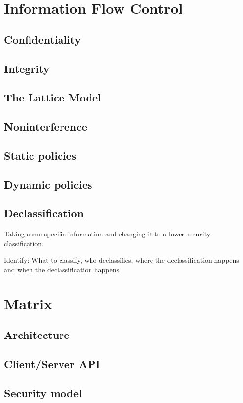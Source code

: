 \section{Information Flow Control} %

\subsection{Confidentiality}

\subsection{Integrity}

\subsection{The Lattice Model}

\subsection{Noninterference}

\subsection{Static policies}

\subsection{Dynamic policies}


\subsection{Declassification}
Taking some specific information and changing it to a lower security classification.

Identify: What to classify, who declassifies, where the declassification happens and when the declassification happens


\section{Matrix} %

\subsection{Architecture}

\subsection{Client/Server API}

\subsection{Security model}